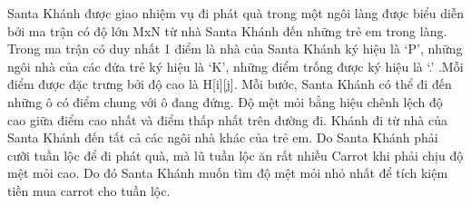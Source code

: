 Santa Khánh được giao nhiệm vụ đi phát quà trong một ngôi làng được biểu diễn bởi ma trận có độ lớn MxN từ nhà Santa Khánh đến những trẻ em trong làng. Trong ma trận có duy nhất 1 điểm là nhà của Santa Khánh ký hiệu là ‘P’, những ngôi nhà của các đứa trẻ ký hiệu là ‘K’, những điểm trống được ký hiệu là ‘.’ .Mỗi điểm được đặc trưng bởi độ cao là H[i][j]. Mỗi bước, Santa Khánh có thể đi đến những ô có điểm chung với ô đang đứng. Độ mệt mỏi bằng hiệu chênh lệch độ cao giữa điểm cao nhất và điểm thấp nhất trên đường đi. Khánh đi từ nhà của Santa Khánh đến tất cả các ngôi nhà khác của trẻ em. Do Santa Khánh phải cưỡi tuần lộc để đi phát quà, mà lũ tuần lộc ăn rất nhiều Carrot khi phải chịu độ mệt mỏi cao. Do đó Santa Khánh muốn tìm độ mệt mỏi nhỏ nhất để tích kiệm tiền mua carrot cho tuần lộc.